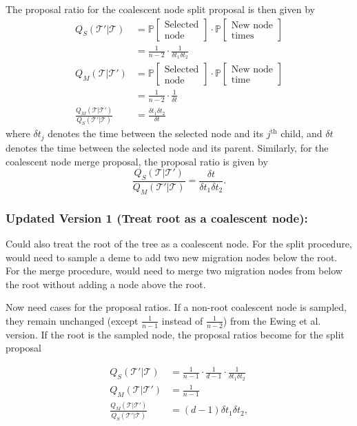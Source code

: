 \documentclass[12pt,a4paper]{article}
\newcommand{\calT}{\mathcal{T}}
\newcommand{\bbP}{\mathbb{P}}
\begin{document}
				The proposal ratio for the coalescent node split proposal is then given by
					\begin{align*}
						Q_S (\calT' | \calT) & = \bbP[\substack{\text{Selected} \\ \text{node}}] \cdot \bbP[ \substack{\text{New node} \\ \text{times}} ] \\
							& = \frac{1}{n-2} \cdot \frac{1}{\delta t_1 \delta t_2} \\
						Q_M (\calT | \calT') & = \bbP[\substack{\text{Selected} \\ \text{node}}] \cdot \bbP[\substack{\text{New node} \\ \text{time}} ] \\
							& = \frac{1}{n-2} \cdot \frac{1}{\delta t} \\
						\frac{Q_M(\calT | \calT')}{Q_S (\calT' | \calT)} & = \frac{\delta t_1 \delta t_2}{\delta t}
					\end{align*}
				where $\delta t_j$ denotes the time between the selected node and its $j^\text{th}$ child, and $\delta t$ denotes the time between the selected node and its parent. Similarly, for the coalescent node merge proposal, the proposal ratio is given by
					\[
						\frac{Q_S(\calT | \calT')}{Q_M (\calT' | \calT)} = \frac{\delta t}{\delta t_1 \delta t_2}.
					\]
					
			\subsubsection{Updated Version 1 (Treat root as a coalescent node):}
				Could also treat the root of the tree as a coalescent node. For the split procedure, would need to sample a deme to add two new migration nodes below the root. For the merge procedure, would need to merge two migration nodes from below the root without adding a node above the root.
				
				Now need cases for the proposal ratios. If a non-root coalescent node is sampled, they remain unchanged (except $\frac{1}{n-1}$ instead of $\frac{1}{n-2}$) from the Ewing et al. version. If the root is the sampled node, the proposal ratios become for the split proposal
				
				\begin{align*}
					Q_S (\calT' | \calT) & = \frac{1}{n-1} \cdot \frac{1}{d-1} \cdot \frac{1}{\delta t_1 \delta t_2} \\
					Q_M (\calT | \calT') & = \frac{1}{n-1} \\
					\frac{Q_M(\calT | \calT')}{Q_S (\calT' | \calT)} & = (d-1) \delta t_1 \delta t_2,
				\end{align*}
		
\end{document}
